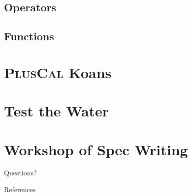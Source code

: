 \documentclass[10pt]{beamer}
\newcommand{\pluscal}{\textbf{\textsc{PlusCal}}\xspace}
\begin{document}
\subsection{Operators}

\subsection{Functions}


\section{\pluscal Koans}

\section{Test the Water}

\section{Workshop of Spec Writing}


\begin{frame}[standout]
  Questions?
\end{frame}

\appendix

\begin{frame}[allowframebreaks]{References}

  \nocite{*}
  
  

\end{frame}
\end{document}
